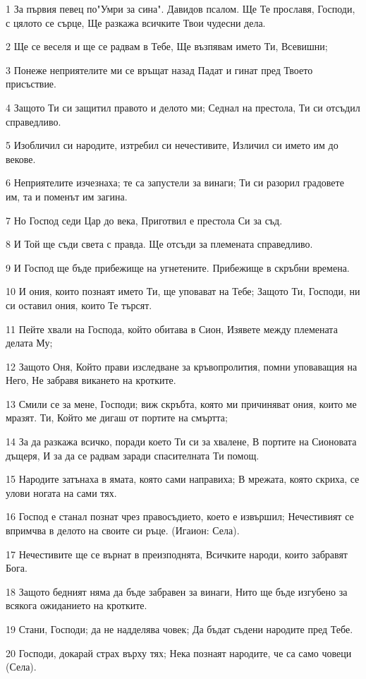 \par 1 За първия певец по"Умри за сина". Давидов псалом. Ще Те прославя, Господи, с цялото се сърце, Ще разкажа всичките Твои чудесни дела.
\par 2 Ще се веселя и ще се радвам в Тебе, Ще възпявам името Ти, Всевишни;
\par 3 Понеже неприятелите ми се връщат назад Падат и гинат пред Твоето присъствие.
\par 4 Защото Ти си защитил правото и делото ми; Седнал на престола, Ти си отсъдил справедливо.
\par 5 Изобличил си народите, изтребил си нечестивите, Изличил си името им до векове.
\par 6 Неприятелите изчезнаха; те са запустели за винаги; Ти си разорил градовете им, та и поменът им загина.
\par 7 Но Господ седи Цар до века, Приготвил е престола Си за съд.
\par 8 И Той ще съди света с правда. Ще отсъди за племената справедливо.
\par 9 И Господ ще бъде прибежище на угнетените. Прибежище в скръбни времена.
\par 10 И ония, които познаят името Ти, ще уповават на Тебе; Защото Ти, Господи, ни си оставил ония, които Те търсят.
\par 11 Пейте хвали на Господа, който обитава в Сион, Изявете между племената делата Му;
\par 12 Защото Оня, Който прави изследване за кръвопролития, помни уповаващия на Него, Не забравя викането на кротките.
\par 13 Смили се за мене, Господи; виж скръбта, която ми причиняват ония, които ме мразят. Ти, Който ме дигаш от портите на смъртта;
\par 14 За да разкажа всичко, поради което Ти си за хвалене, В портите на Сионовата дъщеря, И за да се радвам заради спасителната Ти помощ.
\par 15 Народите затънаха в ямата, която сами направиха; В мрежата, която скриха, се улови ногата на сами тях.
\par 16 Господ е станал познат чрез правосъдието, което е извършил; Нечестивият се впримчва в делото на своите си ръце. (Игаион: Села).
\par 17 Нечестивите ще се върнат в преизподнята, Всичките народи, които забравят Бога.
\par 18 Защото бедният няма да бъде забравен за винаги, Нито ще бъде изгубено за всякога ожиданието на кротките.
\par 19 Стани, Господи; да не надделява човек; Да бъдат съдени народите пред Тебе.
\par 20 Господи, докарай страх върху тях; Нека познаят народите, че са само човеци (Села).

